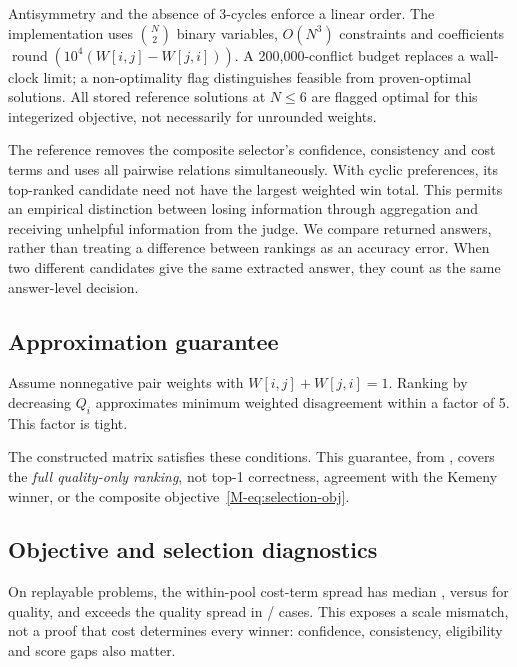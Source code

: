 Antisymmetry and the absence of 3-cycles enforce a linear order.
The implementation uses $\binom{N}{2}$ binary variables, $O(N^3)$
constraints and coefficients $\operatorname{round}(10^4(W[i,j]-W[j,i]))$.
A 200{,}000-conflict budget replaces a wall-clock limit; a non-optimality
flag distinguishes feasible from proven-optimal solutions. All
\KYTopOneN{} stored reference solutions at $N\le6$ are flagged optimal
for this integerized objective, not necessarily for unrounded weights.

The reference removes the composite selector's confidence, consistency and
cost terms and uses all pairwise relations simultaneously. With cyclic
preferences, its top-ranked candidate need not have the largest weighted
win total. This permits an empirical distinction between losing
information through aggregation and receiving unhelpful information from
the judge. We compare returned answers, rather than treating a difference
between rankings as an accuracy error. When two different candidates give
the same extracted answer, they count as the same answer-level decision.

\subsection{Approximation guarantee}
\label{sec:approx-guarantee}

\begin{proposition}
\label{prop:copeland-approx}
Assume nonnegative pair weights with $W[i,j]+W[j,i]=1$.
Ranking by decreasing $Q_i$ approximates minimum weighted disagreement
within a factor of 5. This factor is tight.
\end{proposition}

The constructed matrix satisfies these conditions. This guarantee, from
\citet{coppersmith2006ordering},
covers the \emph{full quality-only ranking}, not top-1 correctness, agreement
with the Kemeny winner, or the composite objective~\eqref{M-eq:selection-obj}.

\subsection{Objective and selection diagnostics}
\label{sec:selection-bias}
\label{sec:cost-diagnosis}
\label{sec:ablations}

On replayable problems, the within-pool cost-term spread has median
\CostSpreadMed{}, versus \QualitySpreadMed{} for quality, and exceeds
the quality spread in \CostDominatesK/\CostDominatesN{} cases. This
exposes a scale mismatch, not a proof that cost determines every winner:
confidence, consistency, eligibility and score gaps also matter.

